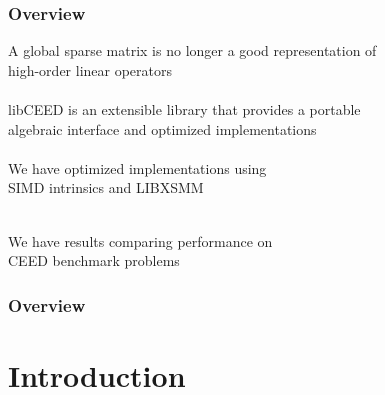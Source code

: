 \documentclass{beamer}
\begin{document}
\begin{frame}
\begin{center}
\frametitle{Overview}

A global sparse matrix is no longer a good representation of\\high-order linear operators\\

~\\

libCEED is an extensible library that provides a portable\\algebraic interface and optimized implementations\\

~\\

We have optimized implementations using\\SIMD intrinsics and LIBXSMM

~\\

We have results comparing performance on\\CEED benchmark problems

\end{center}
\end{frame}
 

\begin{frame}
\frametitle{Overview} %
\tableofcontents %
\end{frame}


\section{Introduction}
\end{document}
